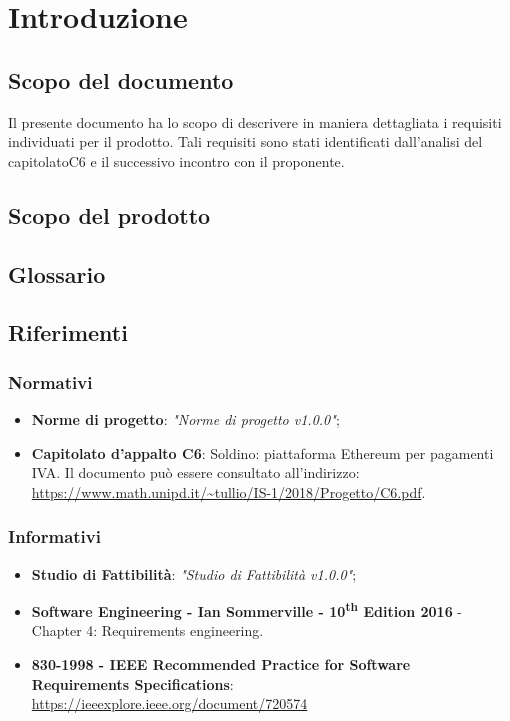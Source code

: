 \section{Introduzione} 
\subsection{Scopo del documento}
Il presente documento ha lo scopo di descrivere in maniera dettagliata i requisiti individuati per il prodotto. Tali requisiti sono stati identificati dall'analisi del capitolato\glosp C6 e il
successivo incontro con il proponente.
\subsection{Scopo del prodotto}
\subsection{Glossario}
\subsection{Riferimenti}
\subsubsection{Normativi}
\begin{itemize}
	\item \textbf{Norme di progetto}: \textit{"Norme di progetto v1.0.0"};
	\item \textbf{Capitolato d'appalto C6}: Soldino: piattaforma Ethereum per pagamenti IVA. Il documento può essere consultato all'indirizzo: \textsf{\url{ https://www.math.unipd.it/~tullio/IS-1/2018/Progetto/C6.pdf}}.
\end{itemize}
\subsubsection{Informativi}
\begin{itemize}
	\item \textbf{Studio di Fattibilità}: \textit{"Studio di Fattibilità v1.0.0"};
	\item \textbf{Software Engineering - Ian Sommerville - 10\textsuperscript{th} Edition 2016}
	\subitem - Chapter 4: Requirements engineering.
	\item \textbf{830-1998 - IEEE Recommended Practice for Software Requirements Specifications}: \textsf{\url{https://ieeexplore.ieee.org/document/720574}}
	
\end{itemize}